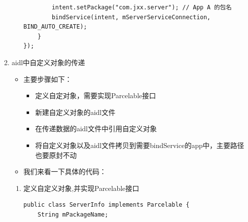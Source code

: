 \documentclass[9pt, b5paper]{article}
\begin{document}
\begin{enumerate}
\begin{enumerate}
\begin{verbatim}
        intent.setPackage("com.jxx.server"); // App A 的包名
        bindService(intent, mServerServiceConnection, BIND_AUTO_CREATE);
    }
});
\end{verbatim}
\end{enumerate}
\item aidl中自定义对象的传递
\label{sec-1-6-1-3}
\begin{itemize}
\item 主要步骤如下：
\begin{itemize}
\item 定义自定对象，需要实现Parcelable接口
\item 新建自定义对象的aidl文件
\item 在传递数据的aidl文件中引用自定义对象
\item 将自定义对象以及aidl文件拷贝到需要bindService的app中，主要路径也要原封不动
\end{itemize}
\item 我们来看一下具体的代码：
\end{itemize}
\begin{enumerate}
\item 定义自定义对象,并实现Parcelable接口
\label{sec-1-6-1-3-1}
\begin{verbatim}
public class ServerInfo implements Parcelable {
    String mPackageName;


\end{verbatim}
\end{enumerate}
\end{enumerate}
\end{document}
